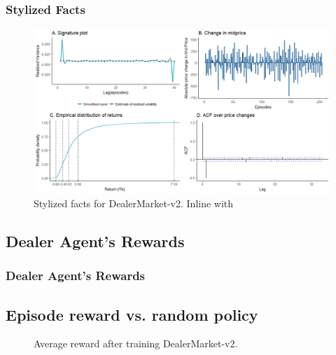 \documentclass[aspectratio=1610]{beamer}
\begin{document}
\begin{frame}
  \frametitle{\hfill Stylized Facts}
  \begin{figure}[H]
		\centering
		\includegraphics[scale=.35]{dmv1_sf_multi.png}
		\caption{Stylized facts for DealerMarket-v2. Inline with \parencite{cont2001empirical, bouchaud2018trades}}
		\label{fig:sf1}
\end{figure}
  
\end{frame}

\subsection{ Dealer Agent's Rewards}

\begin{frame}[shrink=10]
  \frametitle{\hfill Dealer Agent's Rewards}
  
  \subsection*{Episode reward vs. random policy}
    \begin{figure}[H]
    	    	\centering
    		
    		\caption{ \small Average reward after training DealerMarket-v2.}
    		\label{fig:dm1}
    \end{figure}
  
\end{frame}
\end{document}
